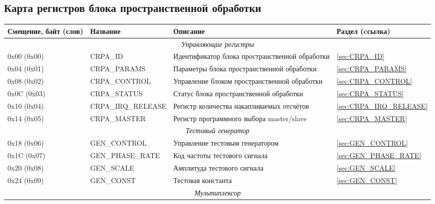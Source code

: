 \subsection{Карта регистров блока пространственной обработки}
\begin{longtable}{|p{30mm}|p{55mm}|p{6cm}|p{15mm}|}
\hline
\textbf{Смещение, байт (слов)} & \textbf{Название} & \textbf{Описание} & \textbf{Раздел (cсылка)} \\
\hline
\multicolumn{4}{|c|}{\textit{Управляющие регистры}} \\
\hline
0x00 (0x00)  & CRPA\_ID             	& Идентификатор блока пространственной обработки& \ref{sec:CRPA_ID} \\
\hline
0x04 (0x01)  & CRPA\_PARAMS   	        & Параметры блока пространственной обработки 	& \ref{sec:CRPA_PARAMS} \\
\hline
0x08 (0x02)  & CRPA\_CONTROL      	& Управление блоком пространственной обработки 	& \ref{sec:CRPA_CONTROL} \\
\hline
0x0C (0x03)  & CRPA\_STATUS    	        & Статус блока пространственной обработки 	& \ref{sec:CRPA_STATUS} \\
\hline
0x10 (0x04)  & CRPA\_IRQ\_RELEASE      	& Регистр количества накапливаемых отсчётов     & \ref{sec:CRPA_IRQ_RELEASE} \\
\hline
0x14 (0x05)  & CRPA\_MASTER         	& Регистр программного выбора master/slave      & \ref{sec:CRPA_MASTER} \\
\hline
\multicolumn{4}{|c|}{\textit{Тестовый генератор}} \\
\hline
0x18 (0x06)  & GEN\_CONTROL            	& Управление тестовым генератором               & \ref{sec:GEN_CONTROL} \\
\hline
0x1C (0x07)  & GEN\_PHASE\_RATE        	& Код частоты тестового сигнала                 & \ref{sec:GEN_PHASE_RATE} \\
\hline
0x20 (0x08)  & GEN\_SCALE            	& Амплитуда тестового сигнала                   & \ref{sec:GEN_SCALE} \\
\hline
0x24 (0x09)  & GEN\_CONST            	& Тестовая константа                            & \ref{sec:GEN_CONST} \\
\hline
\multicolumn{4}{|c|}{\textit{Мультиплексор}} \\

\end{longtable}
